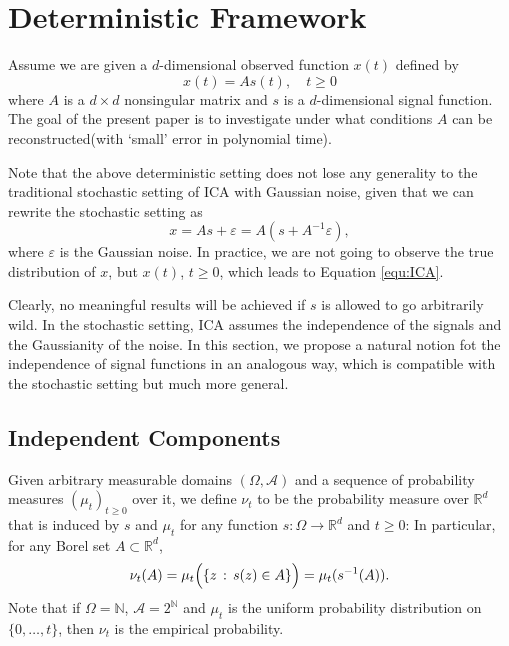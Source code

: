 \documentclass[twoside]{article}
\newcommand{\cset}[2]{\left\{#1\,:\,#2\right\}}
\newcommand{\ra}{\rightarrow}
\newcommand{\real}{\mathbb{R}}
\renewcommand{\natural}{\mathbb{N}}
\theoremstyle{definition}
\renewcommand{\AA}{\mathcal{A}}
\newcommand{\eps}{\varepsilon}
\begin{document}
\section{Deterministic Framework}
\label{sec:DeterFrame}

Assume we are given a $d$-dimensional observed function $x(t)$ defined by  
\begin{equation}
\label{equ:ICA}
x(t) = As(t), \quad t\ge0
\end{equation}
where $A$ is a $d\times d$ nonsingular matrix and  $s$ is a $d$-dimensional signal function. 
The goal of the present paper is to investigate under what conditions $A$ can be reconstructed(with `small' error in polynomial time).

Note that the above deterministic setting does not lose any generality to the traditional stochastic setting of ICA with Gaussian noise, given that we can rewrite the stochastic setting as 
\[
x = As+\eps = A(s+A^{-1}\eps),
\] 
where $\eps$ is the Gaussian noise. In practice, we are not going to observe the true distribution of $x$, but $x(t)$, $t\ge 0$, which leads to Equation \eqref{equ:ICA}.

Clearly, no meaningful results will be achieved if $s$ is allowed to go arbitrarily wild. 
In the stochastic setting, ICA assumes the independence of the signals and the Gaussianity of the noise. 
In this section, we propose a natural notion fot the independence of signal functions in an analogous way, which is compatible with the stochastic setting but much more general.

\subsection{Independent Components}
\label{subsec:IndeComp}
Given arbitrary measurable domains $(\Omega,\AA)$ and a sequence of probability measures $(\mu_t)_{t\ge0}$ over it, we define $\nu_t$ to be the probability measure over $\real^d$ that is induced by $s$ and $\mu_t$ for any function $s: \Omega \ra \real^d$ and $t\ge 0$:
In particular, for any Borel set $A\subset \real^d$,
\[
\nu_t(A)= \mu_t\Bigl( \cset{z}{s(z)\in A} \Bigr)
= \mu_t ( s^{-1}(A) ).
\]
Note that if $\Omega = \natural$, $\AA = 2^\natural$ and $\mu_t$ is the uniform probability distribution on $\{0,\ldots,t\}$, then $\nu_t$ is the empirical probability.
\end{document}
